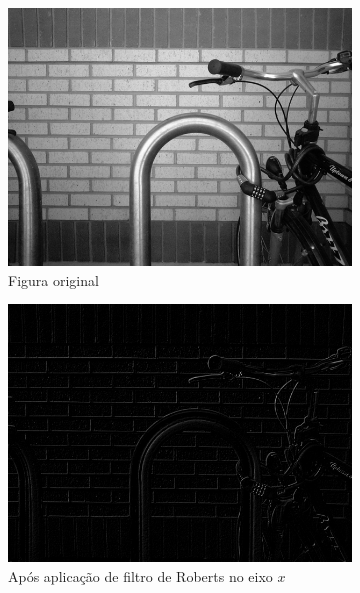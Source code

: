 \documentclass[10pt,a4paper]{article}
\begin{document}
\begin{figure}[!ht]
    \centering
    \begin{subfigure}[ht]{0.45\textwidth}
        \includegraphics[width=\textwidth]{src.jpg}
        \caption{Figura original\cite{bike}}
    \end{subfigure}
    \qquad
    \begin{subfigure}[ht]{0.45\textwidth}
        \includegraphics[width=\textwidth]{roberts_x.jpg}
        \caption{\centering Após aplicação de filtro de Roberts no eixo $x$}
        \label{fig:roberts_x}
    \end{subfigure}
    \\
    \begin{subfigure}[ht]{0.45\textwidth}

\end{subfigure}
\end{figure}
\end{document}
